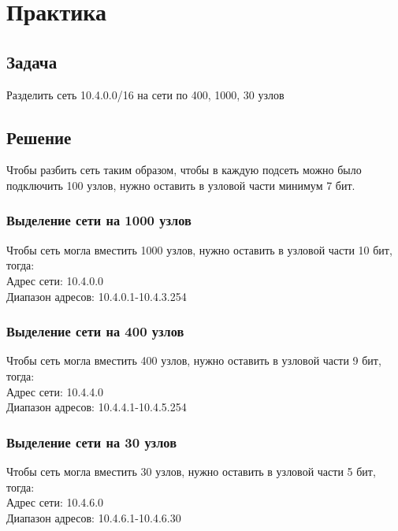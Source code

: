 \chapter{Практика}

\section{Задача}
Разделить сеть 10.4.0.0/16 на сети по 400, 1000, 30 узлов

\section{Решение}

Чтобы разбить сеть таким образом, чтобы в каждую подсеть можно было подключить 100 узлов, нужно оставить в узловой части минимум
7 бит.

\subsection{Выделение сети на 1000 узлов}
Чтобы сеть могла вместить 1000 узлов, нужно оставить в узловой части 10 бит, тогда: \\

Адрес сети: 10.4.0.0 \\
Диапазон адресов: 10.4.0.1-10.4.3.254

\subsection{Выделение сети на 400 узлов}
Чтобы сеть могла вместить 400 узлов, нужно оставить в узловой части 9 бит, тогда: \\

Адрес сети: 10.4.4.0 \\
Диапазон адресов: 10.4.4.1-10.4.5.254

\subsection{Выделение сети на 30 узлов}
Чтобы сеть могла вместить 30 узлов, нужно оставить в узловой части 5 бит, тогда: \\

Адрес сети: 10.4.6.0 \\
Диапазон адресов: 10.4.6.1-10.4.6.30

\endinput